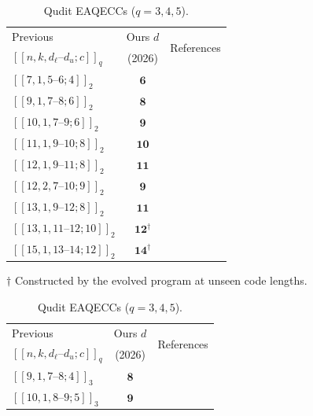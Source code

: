 \begin{table}[!ht]
\centering
\setlength{\tabcolsep}{3pt}
\renewcommand{\arraystretch}{1.18}
\begin{minipage}[t]{0.485\linewidth}
\vspace{0pt}
\centering
\footnotesize
\caption{Qubit EAQECCs ($q=2$).}
\label{tab:results}
\begin{tabular}{@{}lcc@{}}
\toprule
Previous & Ours $d$ & \multirow{2}{*}{References} \\
$[[n,k,d_\ell\text{--}d_u;c]]_q$ & (2026) & \\
\midrule
$[[7,1,5\text{--}6;4]]_2$ & $\mathbf{6}$ & \citet{GHW2020} \\
$[[9,1,7\text{--}8;6]]_2$ & $\mathbf{8}$ & \citet{Luo2022} \\
$[[10,1,7\text{--}9;6]]_2$ & $\mathbf{9}$ & \citet{Luo2022} \\
$[[11,1,9\text{--}10;8]]_2$ & $\mathbf{10}$ & \citet{Luo2022} \\
$[[12,1,9\text{--}11;8]]_2$ & $\mathbf{11}$ & \citet{Luo2022} \\
$[[12,2,7\text{--}10;9]]_2$ & $\mathbf{9}$ & \citet{Luo2022} \\
$[[13,1,9\text{--}12;8]]_2$ & $\mathbf{11}$ & \citet{Luo2022} \\
$[[13,1,11\text{--}12;10]]_2$ & $\mathbf{12}^{\dagger}$ & \citet{Luo2022} \\
$[[15,1,13\text{--}14;12]]_2$ & $\mathbf{14}^{\dagger}$ & \citet{Luo2022} \\
\bottomrule
\end{tabular}
\par\vspace{2pt}
{\scriptsize $\dagger$ Constructed by the evolved program at unseen code lengths.}
\end{minipage}\hfill
\begin{minipage}[t]{0.485\linewidth}
\vspace{0pt}
\centering
\footnotesize
\caption{Qudit EAQECCs ($q=3,4,5$).}
\label{tab:results-qudit}
\begin{tabular}{@{}lcc@{}}
\toprule
Previous & Ours $d$ & \multirow{2}{*}{References} \\
$[[n,k,d_\ell\text{--}d_u;c]]_q$ & (2026) & \\
\midrule
$[[9,1,7\text{--}8;4]]_3$ & $\mathbf{8}$ & \citet{Luo2022} \\
$[[10,1,8\text{--}9;5]]_3$ & $\mathbf{9}$ & \citet{Luo2022} \\

\end{tabular}
\end{minipage}
\end{table}
